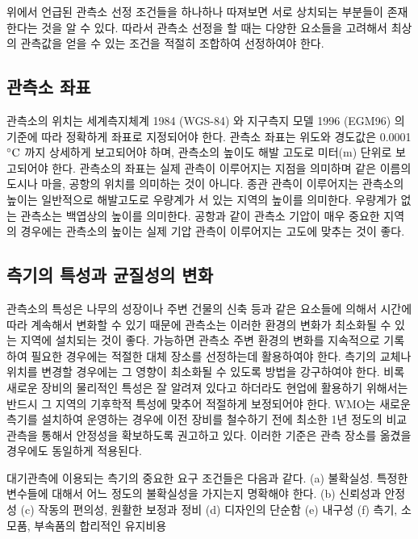 위에서 언급된 관측소 선정 조건들을 하나하나 따져보면 서로 상치되는 부분들이 존재한다는 것을 알 수 있다. 따라서 관측소 선정을 할 때는 다양한 요소들을 고려해서 최상의 관측값을 얻을 수 있는 조건을 적절히 조합하여 선정하여야 한다.

\subsection{관측소 좌표}
관측소의 위치는 세계측지체계 1984 (WGS-84) 와 지구측지 모델 1996 (EGM96) 의 기준에 따라 정확하게 좌표로 지정되어야 한다. 관측소 좌표는 위도와 경도값은 0.0001 $\rm ^{\circ}C$ 까지 상세하게 보고되어야 하며, 관측소의 높이도 해발 고도로 미터(m) 단위로 보고되어야 한다. 관측소의 좌표는 실제 관측이 이루어지는 지점을 의미하며 같은 이름의 도시나 마을, 공항의 위치를 의미하는 것이 아니다. 종관 관측이 이루어지는 관측소의 높이는 일반적으로 해발고도로 우량계가 서 있는 지역의 높이를 의미한다. 우량계가 없는 관측소는 백엽상의 높이를 의미한다. 공항과 같이 관측소 기압이 매우 중요한 지역의 경우에는 관측소의 높이는 실제 기압 관측이 이루어지는 고도에 맞추는 것이 좋다.

\subsection{측기의 특성과 균질성의 변화}
관측소의 특성은 나무의 성장이나 주변 건물의 신축 등과 같은 요소들에 의해서 시간에 따라 계속해서 변화할 수 있기 때문에 관측소는 이러한 환경의 변화가 최소화될 수 있는 지역에 설치되는 것이 좋다. 가능하면 관측소 주변 환경의 변화를 지속적으로 기록하여 필요한 경우에는 적절한 대체 장소를 선정하는데 활용하여야 한다. 측기의 교체나 위치를 변경할 경우에는 그 영향이 최소화될 수 있도록 방법을 강구하여야 한다. 비록 새로운 장비의 물리적인 특성은 잘 알려져 있다고 하더라도 현업에 활용하기 위해서는 반드시 그 지역의 기후학적 특성에 맞추어 적절하게 보정되어야 한다.
WMO는 새로운 측기를 설치하여 운영하는 경우에 이전 장비를 철수하기 전에 최소한 1년 정도의 비교 관측을 통해서 안정성을 확보하도록 권고하고 있다. 이러한 기준은 관측 장소를 옮겼을 경우에도 동일하게 적용된다.

대기관측에 이용되는 측기의 중요한 요구 조건들은 다음과 같다.
(a) 불확실성. 특정한 변수들에 대해서 어느 정도의 불확실성을 가지는지
명확해야 한다.
(b) 신뢰성과 안정성
(c) 작동의 편의성, 원활한 보정과 정비
(d) 디자인의 단순함
(e) 내구성
(f) 측기, 소모품, 부속품의 합리적인 유지비용


